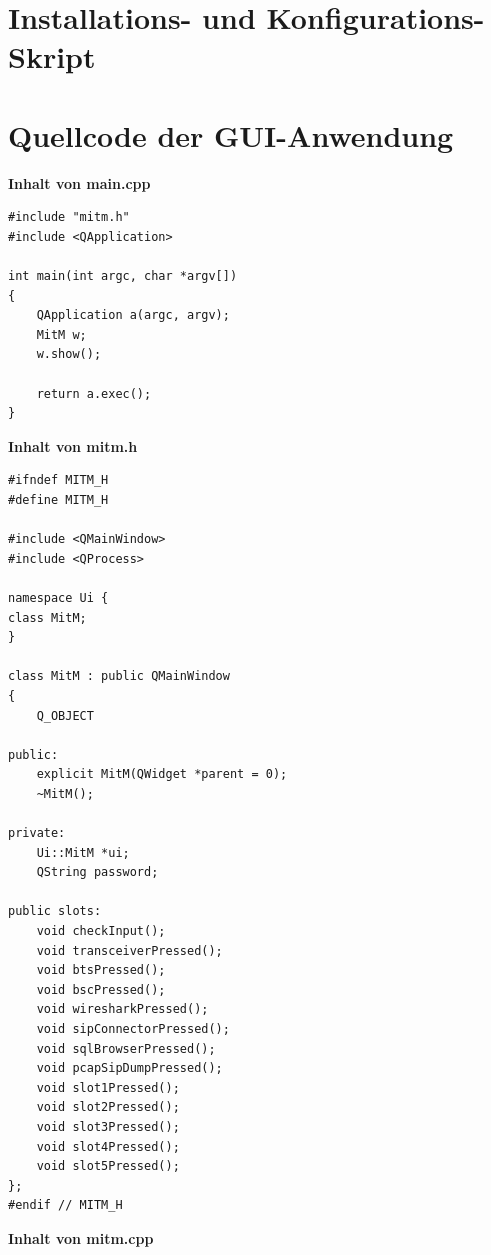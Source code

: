 \newpage
\section{Installations- und Konfigurations-Skript} \label{configureScript}








\section{Quellcode der GUI-Anwendung}

\textbf{Inhalt von main.cpp}

\begin{lstlisting}
#include "mitm.h"
#include <QApplication>

int main(int argc, char *argv[])
{
    QApplication a(argc, argv);
    MitM w;
    w.show();

    return a.exec();
}
\end{lstlisting}



\vspace{2cm}
\textbf{Inhalt von mitm.h}



\begin{lstlisting}
#ifndef MITM_H
#define MITM_H

#include <QMainWindow>
#include <QProcess>

namespace Ui {
class MitM;
}

class MitM : public QMainWindow
{
    Q_OBJECT

public:
    explicit MitM(QWidget *parent = 0);
    ~MitM();

private:
    Ui::MitM *ui;
    QString password;

public slots:
    void checkInput();
    void transceiverPressed();
    void btsPressed();
    void bscPressed();
    void wiresharkPressed();
    void sipConnectorPressed();
    void sqlBrowserPressed();
    void pcapSipDumpPressed();
    void slot1Pressed();
    void slot2Pressed();
    void slot3Pressed();
    void slot4Pressed();
    void slot5Pressed();
};
#endif // MITM_H
\end{lstlisting}



\vspace{2cm}
\textbf{Inhalt von mitm.cpp}

